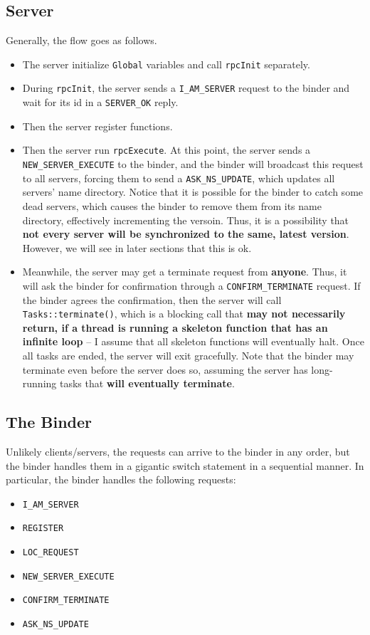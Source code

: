 \subsection{Server}
Generally, the flow goes as follows.
\begin{itemize}
\item
The server initialize {\tt Global} variables and call {\tt rpcInit} separately.
\item
During {\tt rpcInit}, the server sends a {\tt I\_AM\_SERVER} request to the binder and wait for its id in a {\tt SERVER\_OK} reply.
\item
Then the server register functions.
\item
Then the server run {\tt rpcExecute}.
At this point, the server sends a {\tt NEW\_SERVER\_EXECUTE} to the binder, and the binder will broadcast this request to all servers, forcing them to send a {\tt ASK\_NS\_UPDATE}, which updates all servers' name directory.
Notice that it is possible for the binder to catch some dead servers, which causes the binder to remove them from its name directory, effectively incrementing the versoin.
Thus, it is a possibility that {\bf not every server will be synchronized to the same, latest version}.
However, we will see in later sections that this is ok.
\item
Meanwhile, the server may get a terminate request from {\bf anyone}.
Thus, it will ask the binder for confirmation through a {\tt CONFIRM\_TERMINATE} request.
If the binder agrees the confirmation, then the server will call {\tt Tasks::terminate()}, which is a blocking call that {\bf may not necessarily return, if a thread is running a skeleton function that has an infinite loop} -- I assume that all skeleton functions will eventually halt.
Once all tasks are ended, the server will exit gracefully.
Note that the binder may terminate even before the server does so, assuming the server has long-running tasks that {\bf will eventually terminate}.
\end{itemize}

\subsection{The Binder}
Unlikely clients/servers, the requests can arrive to the binder in any order, but the binder handles them in a gigantic switch statement in a sequential manner.
In particular, the binder handles the following requests:
\begin{itemize}
\item
{\tt I\_AM\_SERVER}
\item
{\tt REGISTER}
\item
{\tt LOC\_REQUEST}
\item
{\tt NEW\_SERVER\_EXECUTE}
\item
{\tt CONFIRM\_TERMINATE}
\item
{\tt ASK\_NS\_UPDATE}
\end{itemize}

